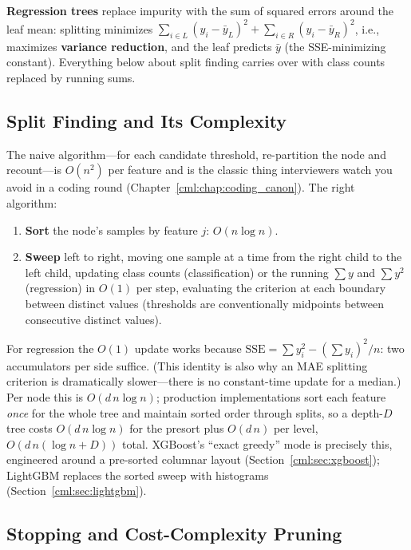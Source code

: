 \textbf{Regression trees} replace impurity with the sum of squared errors around the leaf mean: splitting minimizes $\sum_{i \in L}(y_i - \bar{y}_L)^2 + \sum_{i \in R}(y_i - \bar{y}_R)^2$, i.e., maximizes \textbf{variance reduction}, and the leaf predicts $\bar{y}$ (the SSE-minimizing constant). Everything below about split finding carries over with class counts replaced by running sums.

\subsection{Split Finding and Its Complexity}

The naive algorithm---for each candidate threshold, re-partition the node and recount---is $O(n^2)$ per feature and is the classic thing interviewers watch you avoid in a coding round (Chapter~\ref{cml:chap:coding_canon}). The right algorithm:

\begin{enumerate}
    \item \textbf{Sort} the node's samples by feature $j$: $O(n \log n)$.
    \item \textbf{Sweep} left to right, moving one sample at a time from the right child to the left child, updating class counts (classification) or the running $\sum y$ and $\sum y^2$ (regression) in $O(1)$ per step, evaluating the criterion at each boundary between distinct values (thresholds are conventionally midpoints between consecutive distinct values).
\end{enumerate}

For regression the $O(1)$ update works because $\text{SSE} = \sum y_i^2 - (\sum y_i)^2 / n$: two accumulators per side suffice. (This identity is also why an MAE splitting criterion is dramatically slower---there is no constant-time update for a median.) Per node this is $O(d \, n \log n)$; production implementations sort each feature \textit{once} for the whole tree and maintain sorted order through splits, so a depth-$D$ tree costs $O(d\,n \log n)$ for the presort plus $O(d\,n)$ per level, $O(d\,n(\log n + D))$ total. XGBoost's ``exact greedy'' mode is precisely this, engineered around a pre-sorted columnar layout (Section~\ref{cml:sec:xgboost}); LightGBM replaces the sorted sweep with histograms (Section~\ref{cml:sec:lightgbm}).

\subsection{Stopping and Cost-Complexity Pruning}

